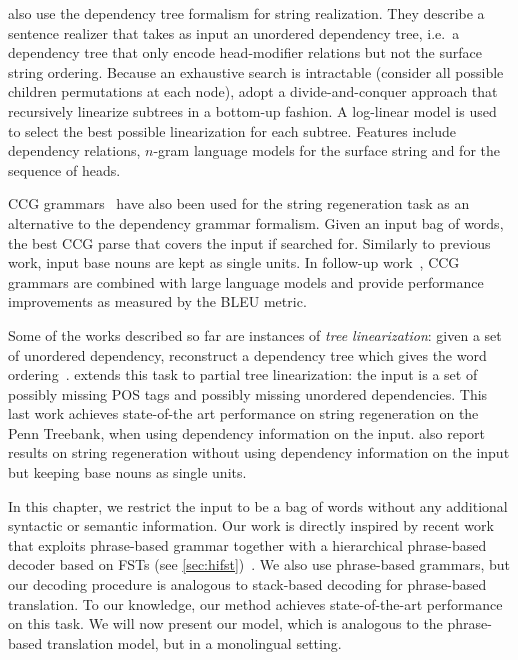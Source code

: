 \citet{he-wang-guo-liu:2009:ACLIJCNLP} also use the dependency tree
formalism for string realization. They describe a sentence
realizer that takes as input an unordered dependency tree, i.e.\ a dependency
tree that only encode head-modifier relations but not the surface
string ordering. Because an exhaustive search is intractable (consider
all possible children permutations at each node), \citet{he-wang-guo-liu:2009:ACLIJCNLP}
adopt a divide-and-conquer approach that recursively linearize
subtrees in a bottom-up fashion. A log-linear model is used
to select the best possible linearization for each subtree.
Features include dependency relations, $n$-gram language models
for the surface string and for the sequence of heads.

CCG grammars~\citep{zhang-clark:2011:EMNLP} have also been used
for the string regeneration task as an alternative
to the dependency grammar formalism. Given an input bag
of words, the best CCG parse that covers the input if searched
for. Similarly to previous work, input base nouns are kept as
single units. In follow-up work~\citep{zhang-blackwood-clark:2012:EACL2012},
CCG grammars are combined with large language models
and provide performance improvements as measured by the BLEU
metric.

Some of the works described so far are instances of \emph{tree linearization}: given
a set of unordered dependency, reconstruct a dependency tree which gives
the word ordering~\citep{belz-bohnet-mille-wanner-white:2012:INLG}.
\citet{zhang:2013:IJCAI} extends this task to partial tree linearization: the
input is a set of possibly missing POS tags and possibly missing unordered
dependencies. This last work achieves state-of-the art performance on string regeneration
on the Penn Treebank, when using dependency information on the input.
\citet{zhang:2013:IJCAI} also report results on string regeneration without
using dependency information on the input but keeping base nouns as single
units.

In this chapter, we restrict the input to be a bag of words without any additional
syntactic or semantic information.
Our work is directly inspired by recent work that exploits phrase-based
grammar together with a hierarchical phrase-based decoder based on
FSTs (see \autoref{sec:hifst})~\citep{degispert-tomalin-byrne:2014:EACL}. We
also use phrase-based grammars, but
our decoding procedure is analogous to stack-based decoding for phrase-based
translation.
To our knowledge, our method achieves state-of-the-art performance
on this task. We will now present our model, which is analogous
to the phrase-based translation model, but in a monolingual setting.


